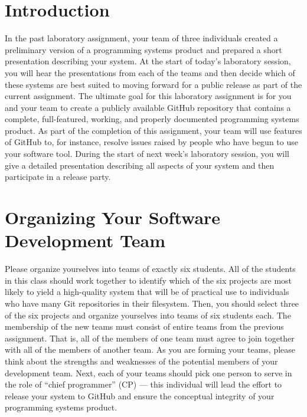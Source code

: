 

\usepackage[compact]{titlesec}



\vspace*{-.1in}
\section*{Introduction}

In the past laboratory assignment, your team of three individuals created a preliminary version of a programming systems
product and prepared a short presentation describing your system. At the start of today's laboratory session, you will
hear the presentations from each of the teams and then decide which of these systems are best suited to moving forward
for a public release as part of the current assignment. The ultimate goal for this laboratory assignment is for you and
your team to create a publicly available GitHub repository that contains a complete, full-featured, working, and
properly documented programming systems product. As part of the completion of this assignment, your team will use
features of GitHub to, for instance, resolve issues raised by people who have begun to use your software tool. During
the start of next week's laboratory session, you will give a detailed presentation describing all aspects of your system
and then participate in a release party.

\section*{Organizing Your Software Development Team}

Please organize yourselves into teams of exactly six students. All of the students in this class should work together to
identify which of the six projects are most likely to yield a high-quality system that will be of practical use to
individuals who have many Git repositories in their filesystem. Then, you should select three of the six projects and
organize yourselves into teams of six students each.  The membership of the new teams must consist of entire teams from
the previous assignment. That is, all of the members of one team must agree to join together with all of the members of
another team.  As you are forming your teams, please think about the strengths and weaknesses of the potential members
of your development team. Next, each of your teams should pick one person to serve in the role of ``chief programmer''
(CP) --- this individual will lead the effort to release your system to GitHub and ensure the conceptual integrity of
your programming systems product.

